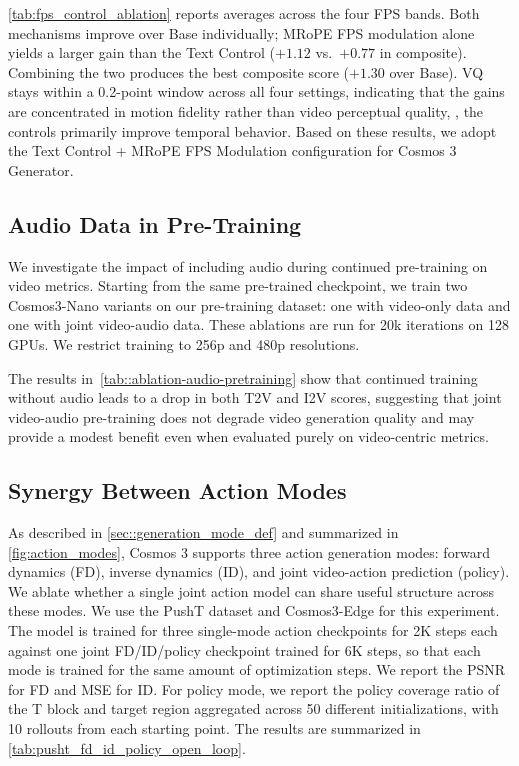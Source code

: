 \cref{tab:fps_control_ablation} reports averages across the four FPS bands. Both mechanisms improve over Base individually; MRoPE FPS modulation alone yields a larger gain than the Text Control ($+1.12$ vs.\ $+0.77$ in composite). Combining the two produces the best composite score ($+1.30$ over Base). VQ stays within a 0.2-point window across all four settings, indicating that the gains are concentrated in motion fidelity rather than video perceptual quality, \ie, the controls primarily improve temporal behavior. Based on these results, we adopt the Text Control + MRoPE FPS Modulation configuration for Cosmos 3 Generator.



\subsection{Audio Data in Pre-Training}

We investigate the impact of including audio during continued pre-training on video metrics. Starting from the same pre-trained checkpoint, we train two Cosmos3-Nano variants on our pre-training dataset: one with video-only data and one with joint video-audio data. These ablations are run for 20k iterations on 128 GPUs. We restrict training to 256p and 480p resolutions.



The results in~\cref{tab::ablation-audio-pretraining} show that continued training without audio leads to a drop in both T2V and I2V scores, suggesting that joint video-audio pre-training does not degrade video generation quality and may provide a modest benefit even when evaluated purely on video-centric metrics.

\subsection{Synergy Between Action Modes}
\label{app:pusht_fd_id_policy_synergy}
As described in \cref{sec::generation_mode_def} and summarized in \cref{fig:action_modes}, Cosmos 3 supports three action generation modes: forward dynamics (FD), inverse dynamics (ID), and joint video-action prediction (policy).
We ablate whether a single joint action model can share useful structure across these modes.
We use the PushT dataset and Cosmos3-Edge for this experiment.
The model is trained for three single-mode action checkpoints for 2K steps each against one joint FD/ID/policy checkpoint trained for 6K steps, so that each mode is trained for the same amount of optimization steps.
We report the PSNR for FD and MSE for ID.
For policy mode, we report the policy coverage ratio of the T block and target region aggregated across 50 different initializations, with 10 rollouts from each starting point.
The results are summarized in \cref{tab:pusht_fd_id_policy_open_loop}.

